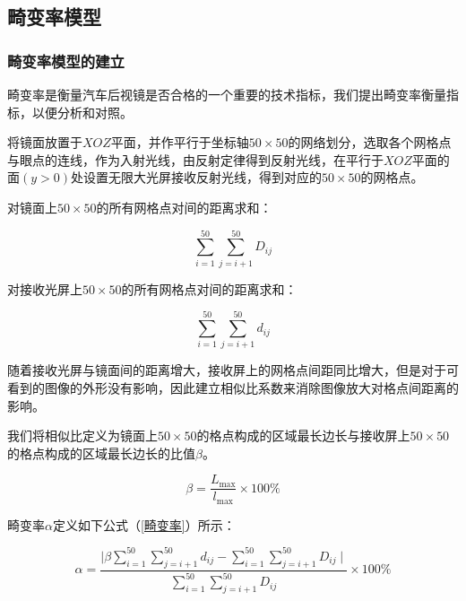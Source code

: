 \documentclass[bwprint]{cumcmthesis}
\begin{document}
\subsection{畸变率模型}
\subsubsection{畸变率模型的建立}

\par 畸变率是衡量汽车后视镜是否合格的一个重要的技术指标，我们提出畸变率衡量指标，以便分析和对照。

\par 将镜面放置于$XOZ$平面，并作平行于坐标轴$50 \times 50$的网络划分，选取各个网格点与眼点的连线，作为入射光线，由反射定律得到反射光线，在平行于$XOZ$平面的面$(y>0)$处设置无限大光屏接收反射光线，得到对应的$50 \times 50$的网格点。
\par 对镜面上$50 \times 50$的所有网格点对间的距离求和：

\begin{equation}
	\sum\limits_{i = 1}^{50}\sum\limits_{j = i + 1}^{50} D_{ij}
\end{equation} 

\par 对接收光屏上$50 \times 50$的所有网格点对间的距离求和：

\begin{equation}
	\sum\limits_{i = 1}^{50}\sum\limits_{j = i + 1}^{50} d_{ij}
\end{equation}

\par 随着接收光屏与镜面间的距离增大，接收屏上的网格点间距同比增大，但是对于可看到的图像的外形没有影响，因此建立相似比系数来消除图像放大对格点间距离的影响。
\par 我们将相似比定义为镜面上$50 \times 50$的格点构成的区域最长边长与接收屏上$50 \times 50$的格点构成的区域最长边长的比值$\beta$。

\begin{equation}
	\beta = \frac{L_{\mathop{max}}}{l_{\mathop{max}}} \times 100 \%
\end{equation}

\par 畸变率$\alpha$定义如下公式（\ref{畸变率}）所示：


\begin{equation}
\label{畸变率}
	\alpha = \frac{\mid \beta \sum\limits_{i = 1}^{50}\sum\limits_{j = i + 1}^{50} d_{ij} - \sum\limits_{i = 1}^{50}\sum\limits_{j = i + 1}^{50} D_{ij} \mid}{\sum\limits_{i = 1}^{50}\sum\limits_{j = i + 1}^{50} D_{ij}} \times 100 \%
\end{equation}
\end{document}
